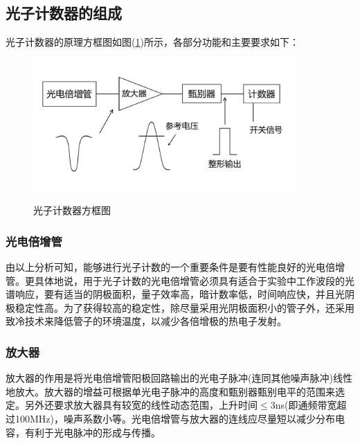 \documentclass[a4paper]{article}
\begin{document}
\subsection{光子计数器的组成}
光子计数器的原理方框图如图(\ref{fig5})所示，各部分功能和主要要求如下：
\begin{figure}[!h]
\centering
\includegraphics[width=0.9\textwidth]{fig/fig5.pdf}\\
\caption{光子计数器方框图}\label{fig5}
\end{figure}

\subsubsection{光电倍增管}
由以上分析可知，能够进行光子计数的一个重要条件是要有性能良好的光电倍增管。更具体地说，用于光子计数的光电倍增管必须具有适合于实验中工作波段的光谱响应，要有适当的阴极面积，量子效率高，暗计数率低，时间响应快，并且光阴极稳定性高。为了获得较高的稳定性，除尽量采用光阴极面积小的管子外，还采用致冷技术来降低管子的环境温度，以减少各倍增极的热电子发射。
\subsubsection{放大器}
放大器的作用是将光电倍增管阳极回路输出的光电子脉冲(连同其他噪声脉冲)线性地放大。放大器的增益可根据单光电子脉冲的高度和甄别器甄别电平的范围来选定。另外还要求放大器具有较宽的线性动态范围，上升时间$\leq$3ns(即通频带宽超过100MHz)，噪声系数小等。光电倍增管与放大器的连线应尽量短以减少分布电容，有利于光电脉冲的形成与传播。
\end{document}
